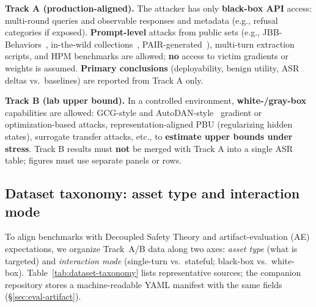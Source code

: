 \documentclass[letterpaper,twocolumn,10pt]{article}
\begin{document}
\textbf{Track A (production-aligned).} The attacker has only \textbf{black-box API} access: multi-round queries and observable responses and metadata (e.g., refusal categories if exposed). \textbf{Prompt-level} attacks from public sets (e.g., JBB-Behaviors~\cite{jailbreakbench}, in-the-wild collections~\cite{wild-jailbreak-prompts}, PAIR-generated~\cite{pair-jailbreak}), multi-turn extraction scripts, and HPM benchmarks are allowed; \textbf{no} access to victim gradients or weights is assumed. \textbf{Primary conclusions} (deployability, benign utility, ASR deltas vs.\ baselines) are reported from Track A only.

\textbf{Track B (lab upper bound).} In a controlled environment, \textbf{white-/gray-box} capabilities are allowed: GCG-style and AutoDAN-style~\cite{gcg,autodan} gradient or optimization-based attacks, representation-aligned PBU (regularizing hidden states), surrogate transfer attacks, etc., to \textbf{estimate upper bounds under stress}. Track B results must \textbf{not} be merged with Track A into a single ASR table; figures must use separate panels or rows.

\subsection{Dataset taxonomy: asset type and interaction mode}
\label{sec:eval-taxonomy}

To align benchmarks with Decoupled Safety Theory and artifact-evaluation (AE) expectations, we organize Track~A/B data along two axes: \emph{asset type} (what is targeted) and \emph{interaction mode} (single-turn vs.\ stateful; black-box vs.\ white-box). Table~\ref{tab:dataset-taxonomy} lists representative sources; the companion repository stores a machine-readable YAML manifest with the same fields (\S\ref{sec:eval-artifact}).
\end{document}
